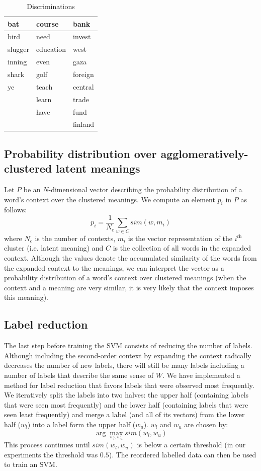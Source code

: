 \documentclass[11pt]{article}
\begin{document}
\begin{table}
\center
    \begin{tabular}{lll}
    bat     & course    & bank    \\ \hline
    bird    & need      & invest  \\
    slugger & education & west    \\
    inning  & even      & gaza    \\
    shark   & golf      & foreign \\
    ye      & teach     & central \\
    ~       & learn     & trade   \\
    ~       & have      & fund    \\
    ~       & ~         & finland \\
    \end{tabular}
    \caption{Discriminations}
\end{table}

\subsection{Probability distribution over agglomeratively-clustered latent meanings}
Let $P$ be an $N$-dimensional vector describing the probability distribution of a word's context over the clustered meanings. We compute an element $p_i$ in $P$ as follows:
\begin{equation}\label{pa}p_i = \frac{1}{N_c}\sum\limits_{w\in C}sim(w, m_i)\end{equation}
where $N_c$ is the number of contexts, $m_i$ is the vector representation of the $i^{\textit{th}}$ cluster (i.e. latent meaning) and $C$ is the collection of all words in the expanded context. 
Although the values denote the accumulated similarity of the words from the expanded context to the meanings, we can interpret the vector as a probability distribution of a word's context over clustered meanings (when the context and a meaning are very similar, it is very likely that the context imposes this meaning). 

\subsection{Label reduction}
The last step before training the SVM consists of reducing the number of labels. Although including the second-order context by expanding the context radically decreases the number of new labels, there will still be many labels including a number of labels that describe the same sense of $W$. We have implemented a method for label reduction that favors labels that were observed most frequently. We iteratively split the labels into two halves: the upper half (containing labels that were seen most frequently) and the lower half (containing labels that were seen least frequently) and merge a label (and all of its vectors) from the lower half ($w_l$) into a label form the upper half ($w_u$). $w_l$ and $w_u$ are chosen by: 
$$\arg\max_{w_l, w_u} \textit{sim}(w_l, w_u)$$
This process continues until $\textit{sim}(w_l, w_u)$ is below a certain threshold (in our experiments the threshold was $0.5$).
The reordered labelled data can then be used to train an SVM.
\end{document}
